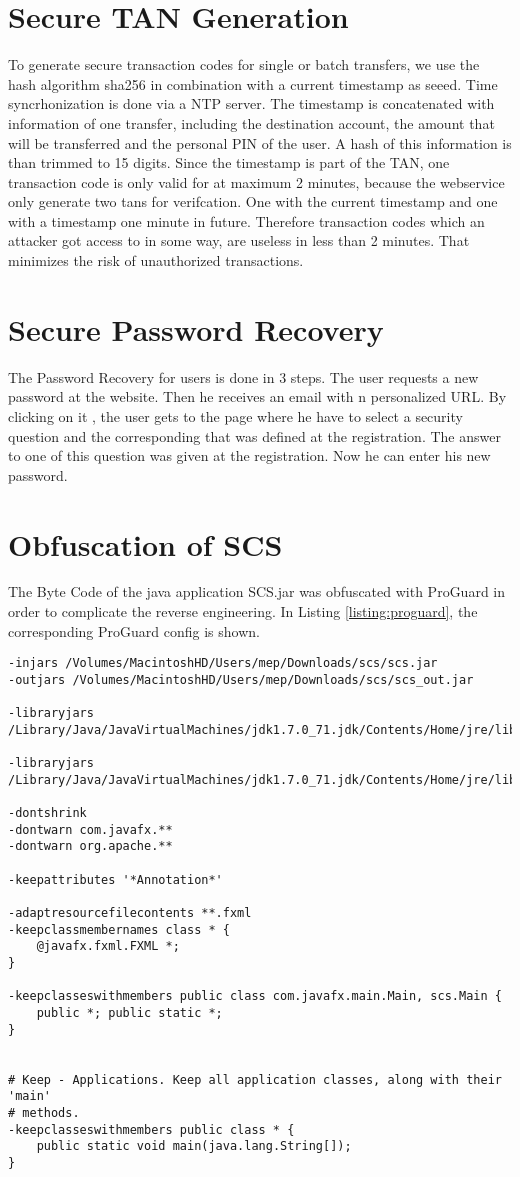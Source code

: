 \section{Secure TAN Generation}
To generate secure transaction codes for single or batch transfers, we use the hash algorithm sha256 in combination with a current timestamp as seeed. Time syncrhonization is done via a NTP server. The timestamp is concatenated with information of one transfer, including the destination account, the amount that will be transferred and the personal PIN of the user. A hash of this information is than trimmed to 15 digits. 
Since the timestamp is part of the TAN, one transaction code is only valid for at maximum 2 minutes, because the webservice only generate two tans for verifcation. One with the current timestamp and one with a timestamp one minute in future. Therefore transaction codes which an attacker got access to in some way, are useless in less than 2 minutes. That minimizes the risk of unauthorized transactions.
\section{Secure Password Recovery}
The Password Recovery for users is done in 3 steps. The user requests a new password at the website. Then he receives an email with n personalized URL. By clicking on it , the user gets to the page where he have to select a security question and the corresponding that was defined at the registration. The answer to one of this question was given at the registration. Now he can enter his new password.
\section{Obfuscation of SCS} 
The Byte Code of the java application SCS.jar was obfuscated with ProGuard in order to complicate the reverse engineering.
In Listing \ref{listing:proguard}, the corresponding ProGuard config is shown.

\begin{lstlisting}[caption=Configuration File of ProGuard, label=listing:proguard]
-injars /Volumes/MacintoshHD/Users/mep/Downloads/scs/scs.jar
-outjars /Volumes/MacintoshHD/Users/mep/Downloads/scs/scs_out.jar
	
-libraryjars /Library/Java/JavaVirtualMachines/jdk1.7.0_71.jdk/Contents/Home/jre/lib/rt.jar
	
-libraryjars /Library/Java/JavaVirtualMachines/jdk1.7.0_71.jdk/Contents/Home/jre/lib/jfxrt.jar
	
-dontshrink
-dontwarn com.javafx.**
-dontwarn org.apache.**
	
-keepattributes '*Annotation*'
	
-adaptresourcefilecontents **.fxml
-keepclassmembernames class * {
	@javafx.fxml.FXML *;
}
	
-keepclasseswithmembers public class com.javafx.main.Main, scs.Main {
	public *; public static *;
}
	
	
# Keep - Applications. Keep all application classes, along with their 'main'
# methods.
-keepclasseswithmembers public class * {
	public static void main(java.lang.String[]);
}
\end{lstlisting}

